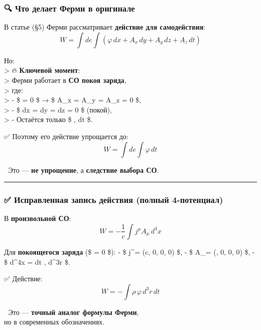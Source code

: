 \documentclass[11pt]{article}
\begin{document}
\subsubsection{🔍 Что делает Ферми в
оригинале}\label{ux447ux442ux43e-ux434ux435ux43bux430ux435ux442-ux444ux435ux440ux43cux438-ux432-ux43eux440ux438ux433ux438ux43dux430ux43bux435}

В статье (§5) Ферми рассматривает \textbf{действие для самодействия}: \[
W = \int de \int \left( \varphi \, dx + A_x \, dy + A_y \, dz + A_z \, dt \right)
\]

Но:\\
\textgreater{} 🔥 \textbf{Ключевой момент}:\\
\textgreater{} Ферми работает в \textbf{СО покоя заряда},\\
\textgreater{} где:\\
\textgreater{} - \$  = 0 \$ → \$ A\_x = A\_y = A\_z = 0 \$,\\
\textgreater{} - \$ dx = dy = dz = 0 \$ (покой),\\
\textgreater{} - Остаётся только \$ \varphi , dt \$.

✅ Поэтому его действие упрощается до: \[
W = \int de \int \varphi \, dt
\]

📌 Это --- \textbf{не упрощение}, а \textbf{следствие выбора СО}.

\begin{center}\rule{0.5\linewidth}{\linethickness}\end{center}

\subsubsection{✅ Исправленная запись действия (полный
4-потенциал)}\label{ux438ux441ux43fux440ux430ux432ux43bux435ux43dux43dux430ux44f-ux437ux430ux43fux438ux441ux44c-ux434ux435ux439ux441ux442ux432ux438ux44f-ux43fux43eux43bux43dux44bux439-4-ux43fux43eux442ux435ux43dux446ux438ux430ux43b}

В \textbf{произвольной СО}: \[
W = -\frac{1}{c} \int j^\mu A_\mu \, d^4x
\]

Для \textbf{покоящегося заряда} (\$  = 0 \$): - \$ j\^{}\mu =
(c\rho, 0, 0, 0) \$, - \$ A\_\mu = (\varphi, 0, 0, 0) \$, - \$ d\^{}4x =
dt , d\^{}3r \$.

✅ Действие: \[
W = -\int \rho \, \varphi \, d^3r \, dt
\]

📌 Это --- \textbf{точный аналог формулы Ферми},\\
но в современных обозначениях.
\end{document}
